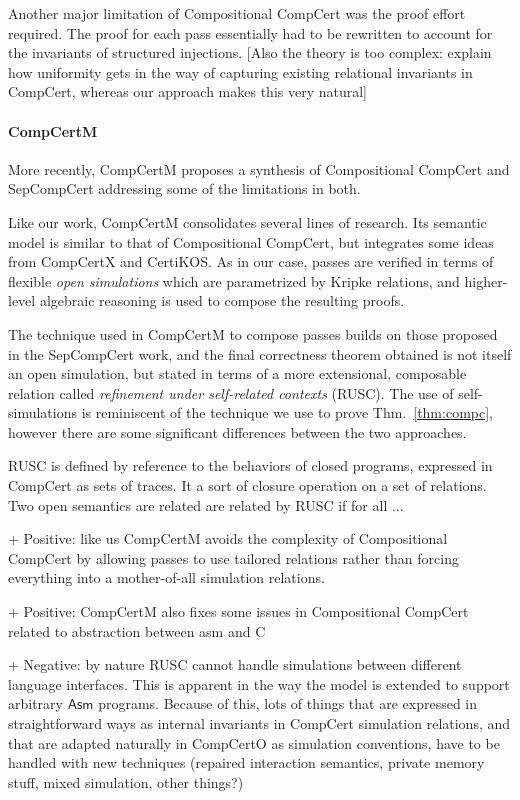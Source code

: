 \documentclass[sigplan,10pt,review,anonymous]{acmart}\settopmatter{printfolios=true,printccs=false,printacmref=false}
\newcommand{\kw}[1]{\ensuremath{ \mathsf{#1} }}
\begin{document}
Another major limitation of Compositional CompCert
was the proof effort required.
The proof for each pass essentially had to be
rewritten to account for the invariants of structured injections.
[Also the theory is too complex:
explain how uniformity gets in the way of capturing
existing relational invariants in CompCert,
whereas our approach makes this very natural]


\paragraph{CompCertM} %

More recently,
CompCertM proposes a synthesis of
Compositional CompCert and SepCompCert
addressing some of the limitations in both.

Like our work,
CompCertM consolidates several lines of research.
Its semantic model is similar to that of Compositional CompCert,
but integrates some ideas from CompCertX and CertiKOS.
As in our case,
passes are verified in terms of flexible \emph{open simulations}
which are parametrized by Kripke relations,
and higher-level algebraic reasoning is used to
compose the resulting proofs.

The technique used in CompCertM to compose passes
builds on those proposed in the SepCompCert work,
and the final correctness theorem obtained
is not itself an open simulation,
but stated in terms of a more extensional,
composable relation
called \emph{refinement under self-related contexts} (RUSC).
The use of self-simulations is reminiscent
of the technique we use to prove Thm.~\ref{thm:compc},
however there are some significant differences between the two
approaches.

RUSC is defined by reference to the behaviors of closed programs,
expressed in CompCert as sets of traces.
It a sort of closure operation on a set of relations.
Two open semantics are related are related by RUSC
if for all ...

+ Positive: like us CompCertM avoids the complexity of
Compositional CompCert by allowing passes to use
tailored relations rather than forcing everything into a
mother-of-all simulation relations.

+ Positive: CompCertM also fixes some issues in Compositional
CompCert related to abstraction between asm and C

+ Negative: by nature RUSC cannot handle
simulations between different language interfaces.
This is apparent in the way the model is extended to support
arbitrary \kw{Asm} programs.
Because of this,
lots of things that are expressed in straightforward ways
as internal invariants in CompCert simulation relations,
and that are adapted naturally in CompCertO as simulation conventions,
have to be handled with new techniques
(repaired interaction semantics,
private memory stuff,
mixed simulation,
other things?)
\end{document}
